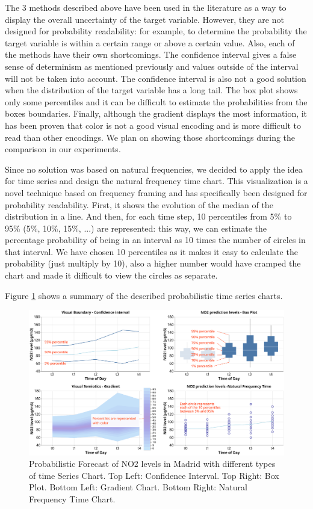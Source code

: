 \documentclass[a4paper,3p,sort&compress]{elsarticle}
\begin{document}
The 3 methods described above have been used in the literature as a way to display the overall uncertainty 
of the target variable. However, they are not designed for probability readability: for example, to determine 
the probability the target variable is within a certain range or above a certain value. Also,
each of the methods have their own shortcomings. The confidence interval gives a false sense of determinism as mentioned previously
and values outside of the interval will not be taken into account. The confidence interval is also not a good solution 
when the distribution of the target variable has a long tail. The box plot shows only some percentiles and it can be difficult to 
estimate the probabilities from the boxes boundaries. Finally, although the gradient displays the most information, it has been 
proven that color is not 
a good visual encoding and is more difficult to read than other encodings. We plan on showing those shortcomings during the comparison in our experiments.

Since no solution was based on natural frequencies, we decided to apply the idea for time series and design the natural frequency time chart.
This visualization is a novel technique based on frequency framing and has 
specifically been designed for probability readability. First, 
it shows the evolution of the median of the distribution in a line. And then, for each time 
step, 10 percentiles from 5\% to 95\% (5\%, 10\%, 15\%, ...) are represented: this way, we can estimate the percentage 
probability of being in an interval as 10 times the number of circles in that interval. 
We have chosen 10 percentiles as it makes it easy to calculate the probability (just multiply by 10), also a higher number
would have cramped the chart and made it difficult to view the circles as separate. 

Figure \ref{figure:charts} shows a summary of the described probabilistic time series charts.

\begin{figure}
  \centering
  \includegraphics[width=.9\textwidth]{charts_vector} 
  \caption{\label{figure:charts} Probabilistic Forecast of NO2 levels in Madrid with different types of time Series Chart. 
  Top Left: Confidence Interval. Top Right: Box Plot. 
  Bottom Left: Gradient Chart. Bottom Right: Natural Frequency Time Chart. }
\end{figure} 
\end{document}
